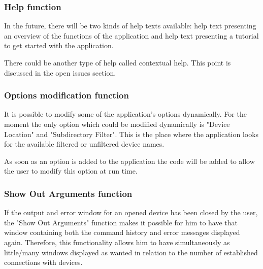 \subsubsection{Help function}

In the future, there will be two kinds of help texts available: 
help text presenting an overview of the functions of the application and 
help text presenting a tutorial to get started with the application.

There could be another type of help called contextual help. This point is
discussed in the open issues section.

\subsubsection{Options modification function}

It is possible to modify some of the application's options dynamically. For the
moment the only option which could be modified dynamically is "Device Location"
and "Subdirectory Filter". This is the place where the application looks for 
the available filtered or unfiltered device names.

As soon as an option is added to the application the code will be added to allow
the user to modify this option at run time.

\subsubsection{Show Out Arguments function}

If the output and error window for an opened device has been closed by the user,
the "Show Out Arguments" function makes it possible for him to have 
that window containing both the command history and     
error messages displayed again. Therefore, this functionality allows him to 
have simultaneously as little/many windows displayed as wanted in relation to 
the number of established connections with devices.

